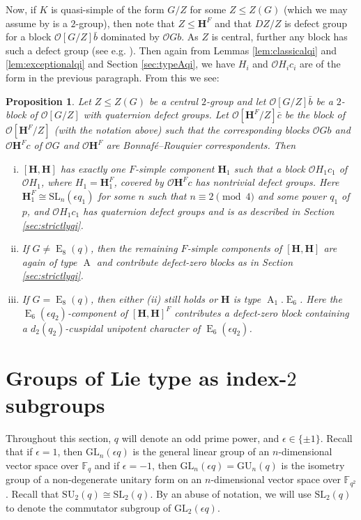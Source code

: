 \documentclass{amsart}
\theoremstyle{plain}\newtheorem{Theorem}{Theorem}[section]
\theoremstyle{plain}\newtheorem{Conjecture}[Theorem]{Conjecture}
\theoremstyle{plain}\newtheorem{Corollary}[Theorem]{Corollary}
\theoremstyle{plain}\newtheorem{Lemma}[Theorem]{Lemma}
\theoremstyle{plain}\newtheorem{Proposition}[Theorem]{Proposition}
\theoremstyle{definition}\newtheorem{Definition}[Theorem]{Definition}
\theoremstyle{definition}\newtheorem{Example}[Theorem]{Example}
\theoremstyle{definition}\newtheorem{Examples}[Theorem]{Examples}
\theoremstyle{definition}\newtheorem{Exercise}[Theorem]{Exercise}
\theoremstyle{definition}\newtheorem{Notation}[Theorem]{Notation}
\theoremstyle{definition}\newtheorem{Remark}[Theorem]{Remark}
\theoremstyle{definition}\newtheorem{Remarks}[Theorem]{Remarks}
\def\CO{{\mathcal{O}}}    \def\OPE{{\mathcal{O}(P\rtimes E)}}
\def\GL{\mathrm{GL}}
\def\GU{\mathrm{GU}}
\def\SL{\mathrm{SL}}
\def\SU{\mathrm{SU}}
\newcommand{\bH}{{\mathbf{H}}}
\newcommand{\type}{\operatorname}
\newcommand{\tA}{\type{A}}
\newcommand{\tE}{\type{E}}
\newcommand{\zent} {Z}
\numberwithin{equation}{section}
\begin{document}
Now, if $K$ is quasi-simple of the  form $G/Z$ for some $Z\leq \zent(G)$ (which we may assume by \cite[Thm.~9.9c]{N98} is a $2$-group), then note that $Z\leq \bH^F$ and that $DZ/Z$ is defect group for a block $\CO[G/Z]\bar b$ dominated by $\CO G b$. As $Z$ is central, further any block has such a defect group (see e.g. \cite[Lem.~17.2]{CaEnbook}). Then again from Lemmas \ref{lem:classicalqi} and \ref{lem:exceptionalqi} and Section \ref{sec:typeAqi}, we have $H_i$ and $\CO H_ic_i$ are of the form in the previous paragraph. From this we see:


\begin{Proposition}\label{prop:structurequasisimplegenquat}
     Let $Z\leq \zent(G)$ be a central $2$-group and let $\CO[G/Z]\bar b$ be a $2$-block of $\CO[G/Z]$ with  quaternion defect groups. Let $\CO[\bH^F/Z]\bar c$ be the block of $\CO[\bH^F/Z]$ (with the notation above) such that the corresponding blocks $\CO G b$ and $\CO \bH^F c$ of $\CO G$ and $\CO \bH^F$ are Bonnaf{\'e}--Rouquier correspondents. Then 
    \begin{enumerate}[(i)]
        \item $[\bH, \bH]$ has exactly one $F$-simple component $\bH_1$ such that a block $\CO H_1 c_1$ of $\CO H_1$, where $H_1=\bH_1^F$, covered by $\CO \bH^F c$ has nontrivial defect groups. Here $\bH_1^F\cong \SL_n(\epsilon q_1)$ for some $n$ such that $n\equiv 2\pmod 4$ and some power $q_1$ of $p$, and $\CO H_1 c_1$ has quaternion defect groups and is as described in Section \ref{sec:strictlyqi}.
        \item If $G\neq \tE_8(q)$, then the remaining $F$-simple components of $[\bH, \bH]$ are again of type $\tA$ and contribute defect-zero blocks as in Section \ref{sec:strictlyqi}.
        \item If $G=\tE_8(q)$, then either (ii) still holds or $\bH$ is type  $\tA_1.\tE_6$. Here the $\tE_6(\epsilon q_2)$-component of $[\bH, \bH]^F$ contributes a defect-zero block containing a $d_2(q_2)$-cuspidal unipotent character of $\tE_6(\epsilon q_2)$.
    \end{enumerate}\end{Proposition}


\section{Groups of Lie type as index-$2$ subgroups}\label{sec:AD} 
Throughout this section,  $q$  will denote an odd prime power, and $\epsilon \in \{\pm 1\} $.   Recall that if $\epsilon =1 $, then   $\GL_n (\epsilon q)$  is   the general linear group of  an $n$-dimensional vector space over ${\mathbb F}_{q} $  and  if $\epsilon =-1$, then $\GL_n(\epsilon q)= \GU_n(q)$ is the  isometry group of a non-degenerate  unitary form on  an $n$-dimensional vector space 
over ${\mathbb F}_{q^2} $. Recall that $\SU_2(q)  \cong  \SL_2(q)$. By an abuse of notation, we  will use  $\SL_2(q)$  to  denote the  commutator subgroup  of  $ \GL_2(\epsilon q) $.
\end{document}
